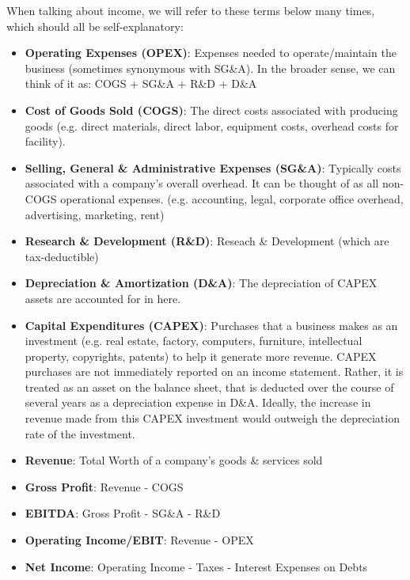 \documentclass{article}
\begin{document}
When talking about income, we will refer to these terms below many times, which should all be self-explanatory:
\begin{itemize}
\item \textbf{Operating Expenses (OPEX)}: Expenses needed to operate/maintain the business (sometimes synonymous with SG\&A). In the broader sense, we can think of it as: COGS + SG\&A + R\&D + D\&A
\item \textbf{Cost of Goods Sold (COGS)}: The direct costs associated with producing goods (e.g. direct materials, direct labor, equipment costs, overhead costs for facility).
\item \textbf{Selling, General \& Administrative Expenses (SG\&A)}: Typically costs associated with a company's overall overhead. It can be thought of as all non-COGS operational expenses. (e.g. accounting, legal, corporate office overhead, advertising, marketing, rent)
\item \textbf{Research \& Development (R\&D)}: Reseach \& Development (which are tax-deductible)
\item \textbf{Depreciation \& Amortization (D\&A)}: The depreciation of CAPEX assets are accounted for in here.
\item \textbf{Capital Expenditures (CAPEX)}: Purchases that a business makes as an investment (e.g. real estate, factory, computers, furniture, intellectual property, copyrights, patents) to help it generate more revenue. CAPEX purchases are not immediately reported on an income statement. Rather, it is treated as an asset on the balance sheet, that is deducted over the course of several years as a depreciation expense in D\&A. Ideally, the increase in revenue made from this CAPEX investment would outweigh the depreciation rate of the investment.
\item \textbf{Revenue}:  Total Worth of a company's goods \& services sold
\item \textbf{Gross Profit}: Revenue - COGS
\item \textbf{EBITDA}: Gross Profit - SG\&A - R\&D
\item \textbf{Operating Income/EBIT}: Revenue - OPEX
\item \textbf{Net Income}: Operating Income - Taxes - Interest Expenses on Debts
\end{itemize}
\end{document}
